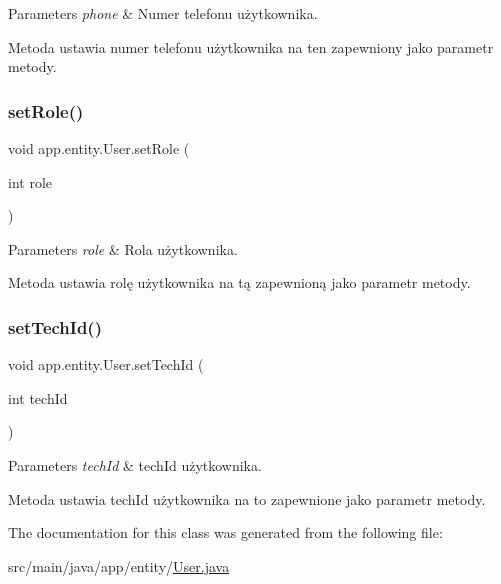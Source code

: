 \begin{DoxyParams}{Parameters}
{\em phone} & Numer telefonu użytkownika.\\
\hline
\end{DoxyParams}
Metoda ustawia numer telefonu użytkownika na ten zapewniony jako parametr metody. \mbox{\label{classapp_1_1entity_1_1_user_aae0cf8be2f45363c7aaa6c5a6f4bf0d4}} 
\subsubsection{\texorpdfstring{setRole()}{setRole()}}
{\footnotesize\ttfamily void app.\+entity.\+User.\+set\+Role (\begin{DoxyParamCaption}\item[{int}]{role }\end{DoxyParamCaption})}


\begin{DoxyParams}{Parameters}
{\em role} & Rola użytkownika.\\
\hline
\end{DoxyParams}
Metoda ustawia rolę użytkownika na tą zapewnioną jako parametr metody. \mbox{\label{classapp_1_1entity_1_1_user_ab50ff650450c4e30fd09717de9b8f74b}} 
\subsubsection{\texorpdfstring{setTechId()}{setTechId()}}
{\footnotesize\ttfamily void app.\+entity.\+User.\+set\+Tech\+Id (\begin{DoxyParamCaption}\item[{int}]{tech\+Id }\end{DoxyParamCaption})}


\begin{DoxyParams}{Parameters}
{\em tech\+Id} & tech\+Id użytkownika.\\
\hline
\end{DoxyParams}
Metoda ustawia tech\+Id użytkownika na to zapewnione jako parametr metody. 

The documentation for this class was generated from the following file\+:\begin{DoxyCompactItemize}
\item 
src/main/java/app/entity/\mbox{\hyperlink{_user_8java}{User.\+java}}\end{DoxyCompactItemize}
